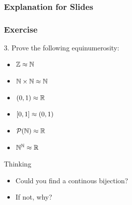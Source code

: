 \documentclass{beamer}
\begin{document}
\begin{frame}
    \frametitle{Explanation for Slides}
\end{frame}
\begin{frame}
    \frametitle{Exercise}
    3. Prove the following equinumerosity:
    \begin{itemize}
        \item $\mathbb{Z}\approx\mathbb{N}$
        \item $\mathbb{N} \times \mathbb{N} \approx \mathbb{N}$
        \item $(0,1) \approx \mathbb{R}$
        \item $[0,1] \approx (0,1)$
        \item $\mathcal{P} (\mathbb{N}) \approx \mathbb{R}$
        \item $\mathbb{N}^{\mathbb{N}} \approx \mathbb{R}$
    \end{itemize}
    \vs{1em}
    \begin{block}{Thinking}
        \begin{itemize}
            \item Could you find a continous bijection?
            \item If not, why?
        \end{itemize}
    \end{block}

\end{frame}
\end{document}
